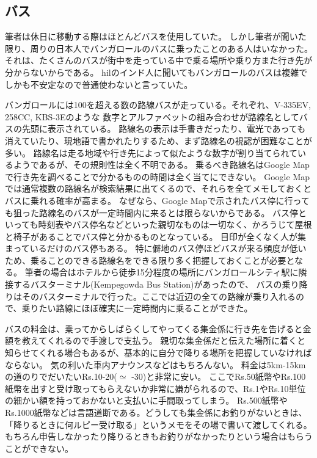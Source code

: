 \subsection{バス}
筆者は休日に移動する際はほとんどバスを使用していた。
しかし筆者が聞いた限り、周りの日本人でバンガロールのバスに乗ったことのある人はいなかった。
それは、たくさんのバスが街中を走っている中で乗る場所や乗り方また行き先が分からないからである。
\acrshort{hil}のインド人に聞いてもバンガロールのバスは複雑でしかも不安定なので普通使わないと言っていた。
\par
バンガロールには100を超える数の路線バスが走っている。それぞれ、V-335EV, 258CC, KBS-3Eのような
数字とアルファベットの組み合わせが路線名としてバスの先頭に表示されている。
路線名の表示は手書きだったり、電光であっても消えていたり、現地語で書かれたりするため、まず路線名の視認が困難なことが多い。
路線名は走る地域や行き先によって似たような数字が割り当てられているようであるが、その規則性は全く不明である。
乗るべき路線名はGoogle Mapで行き先を調べることで分かるものの時間は全く当てにできない。
Google Mapでは通常複数の路線名が検索結果に出てくるので、それらを全てメモしておくとバスに乗れる確率が高まる。
なぜなら、Google Mapで示されたバス停に行っても狙った路線名のバスが一定時間内に来るとは限らないからである。
バス停といっても時刻表やバス停名などといった親切なものは一切なく、かろうじて屋根と椅子があることでバス停と分かるものとなっている。
目印が全くなく人が集まっているだけのバス停もある。
特に僻地のバス停ほどバスが来る頻度が低いため、乗ることのできる路線名をできる限り多く把握しておくことが必要となる。
筆者の場合はホテルから徒歩15分程度の場所にバンガロールシティ駅に隣接するバスターミナル(Kempegowda Bus Station)があったので、
バスの乗り降りはそのバスターミナルで行った。ここでは近辺の全ての路線が乗り入れるので、乗りたい路線にほぼ確実に一定時間内に乗ることができた。
\par
バスの料金は、乗ってからしばらくしてやってくる集金係に行き先を告げると金額を教えてくれるので手渡しで支払う。
親切な集金係だと伝えた場所に着くと知らせてくれる場合もあるが、基本的に自分で降りる場所を把握していなければならない。
気の利いた車内アナウンスなどはもちろんない。
料金は5km-15kmの道のりでだいたいRs.10-20($\simeq$ -30)と非常に安い。
ここでRs.50紙幣やRs.100紙幣を出すと受け取ってもらえないか非常に嫌がられるので、Rs.1やRs.10単位の細かい額を持っておかないと支払いに手間取ってしまう。
Rs.500紙幣やRs.1000紙幣などは言語道断である。どうしても集金係にお釣りがないときは、
「降りるときに何ルピー受け取る」というメモをその場で書いて渡してくれる。
もちろん申告しなかったり降りるときもお釣りがなかったりという場合はもらうことができない。
